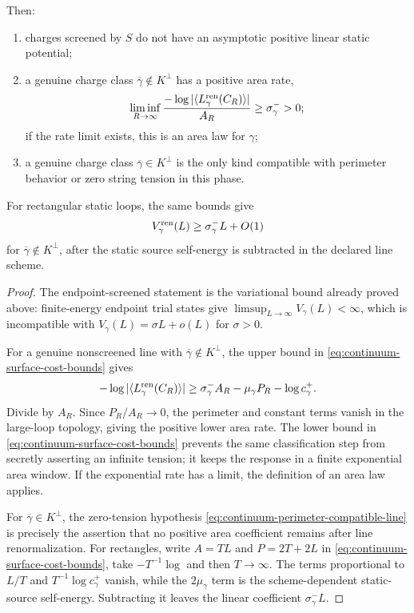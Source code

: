 \begin{lemma}
Then:
\begin{enumerate}
  \item charges screened by \(S\) do not have an asymptotic positive linear
  static potential;
  \item a genuine charge class \(\overline\gamma\notin K^\perp\) has a positive
  area rate,
  \[
    \liminf_{R\to\infty}
    \frac{-\log|\langle L_\gamma^{\rm ren}(C_R)\rangle|}{A_R}
    \ge \sigma_\gamma^- >0 ;
  \]
  if the rate limit exists, this is an area law for \(\gamma\);
  \item a genuine charge class \(\overline\gamma\in K^\perp\) is the only kind
  compatible with perimeter behavior or zero string tension in this phase.
\end{enumerate}
For rectangular static loops, the same bounds give
\[
  V_\gamma^{\rm ren}(L)\ge \sigma_\gamma^- L+O(1)
\]
for \(\overline\gamma\notin K^\perp\), after the static source self-energy is
subtracted in the declared line scheme.
\end{lemma}

\begin{proof}
The endpoint-screened statement is the variational bound already proved above:
finite-energy endpoint trial states give
\(\limsup_{L\to\infty}V_\gamma(L)<\infty\), which is incompatible with
\(V_\gamma(L)=\sigma L+o(L)\) for \(\sigma>0\).

For a genuine nonscreened line with
\(\overline\gamma\notin K^\perp\), the upper bound in
\eqref{eq:continuum-surface-cost-bounds} gives
\[
  -\log|\langle L_\gamma^{\rm ren}(C_R)\rangle|
  \ge
  \sigma_\gamma^-A_R-\mu_\gamma P_R-\log c_\gamma^+ .
\]
Divide by \(A_R\).  Since \(P_R/A_R\to0\), the perimeter and constant terms
vanish in the large-loop topology, giving the positive lower area rate.  The
lower bound in \eqref{eq:continuum-surface-cost-bounds} prevents the same
classification step from secretly asserting an infinite tension; it keeps the
response in a finite exponential area window.  If the exponential rate has a
limit, the definition of an area law applies.

For \(\overline\gamma\in K^\perp\), the zero-tension hypothesis
\eqref{eq:continuum-perimeter-compatible-line} is precisely the assertion that
no positive area coefficient remains after line renormalization.  For
rectangles, write \(A=TL\) and \(P=2T+2L\) in
\eqref{eq:continuum-surface-cost-bounds}, take
\(-T^{-1}\log\) and then \(T\to\infty\).  The terms proportional to \(L/T\)
and \(T^{-1}\log c_\gamma^+\) vanish, while the \(2\mu_\gamma\) term is the
scheme-dependent static-source self-energy.  Subtracting it leaves the linear
coefficient \(\sigma_\gamma^-L\).
\end{proof}

